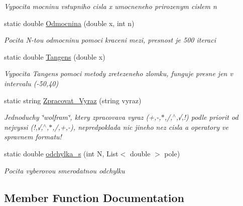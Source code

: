 \begin{DoxyCompactItemize}
\begin{DoxyCompactList}\small\item\em Vypocita mocninu vstupniho cisla x umocneneho prirozenym cislem n \end{DoxyCompactList}\item 
static double \mbox{\hyperlink{class_math_library_1_1math_aa28f90e3e657831aa9d634f1d0410413}{Odmocnina}} (double x, int n)
\begin{DoxyCompactList}\small\item\em Pocita N-\/tou odmocninu pomoci kraceni mezi, presnost je 500 iteraci \end{DoxyCompactList}\item 
static double \mbox{\hyperlink{class_math_library_1_1math_a389c42a9997236b24c2b0af1c43c625d}{Tangens}} (double x)
\begin{DoxyCompactList}\small\item\em Vypocita Tangens pomoci metody zretezeneho zlomku, funguje presne jen v intervalu (-\/50,40) \end{DoxyCompactList}\item 
static string \mbox{\hyperlink{class_math_library_1_1math_a4f3512b2dcb484d8b579274c5813f706}{Zpracovat\+\_\+\+Vyraz}} (string vyraz)
\begin{DoxyCompactList}\small\item\em Jednoduchy \char`\"{}wolfram\char`\"{}, ktery zpracovava vyraz (+,-\/,$\ast$,/,$^\wedge$,√,!) podle priorit od nejvyssi (!,√,$^\wedge$,$\ast$,/,+,-\/), nepredpoklada nic jineho nez cisla a operatory ve spravnem formatu! \end{DoxyCompactList}\item 
static double \mbox{\hyperlink{class_math_library_1_1math_a95a9b98b570e2f0ba44042550d9480c1}{odchylka\+\_\+s}} (int N, List$<$ double $>$ pole)
\begin{DoxyCompactList}\small\item\em Pocita vyberovou smerodatnou odchylku \end{DoxyCompactList}\end{DoxyCompactItemize}


\subsection{Member Function Documentation}
\mbox{\label{class_math_library_1_1math_af838c111bbe0f378bb2ccfb3591cce3a}} 
